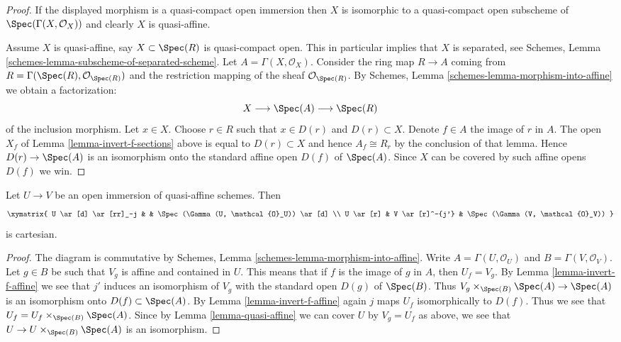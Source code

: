 \begin{proof}
If the displayed morphism is a quasi-compact open immersion then
$X$ is isomorphic to a quasi-compact open subscheme of
$\Spec(\Gamma(X, \mathcal{O}_X))$ and clearly $X$ is quasi-affine.

\medskip\noindent
Assume $X$ is quasi-affine, say $X \subset \Spec(R)$ is
quasi-compact open. This in particular implies that $X$ is
separated, see
Schemes, Lemma \ref{schemes-lemma-subscheme-of-separated-scheme}.
Let $A = \Gamma(X, \mathcal{O}_X)$.
Consider the ring map $R \to A$ coming from
$R = \Gamma(\Spec(R), \mathcal{O}_{\Spec(R)})$
and the restriction mapping of the sheaf $\mathcal{O}_{\Spec(R)}$.
By Schemes, Lemma \ref{schemes-lemma-morphism-into-affine}
we obtain a factorization:
$$
X \longrightarrow
\Spec(A) \longrightarrow
\Spec(R)
$$
of the inclusion morphism. Let $x \in X$. Choose $r \in R$ such that
$x \in D(r)$ and $D(r) \subset X$. Denote $f \in A$ the image of $r$
in $A$. The open $X_f$ of Lemma \ref{lemma-invert-f-sections}
above is equal to $D(r) \subset X$ and hence $A_f \cong R_r$ by the
conclusion of that lemma.
Hence $D(r) \to \Spec(A)$ is an isomorphism onto the
standard affine open $D(f)$ of $\Spec(A)$. Since $X$
can be covered by such affine opens $D(f)$ we win.
\end{proof}

\begin{lemma}
\label{lemma-cartesian-diagram-quasi-affine}
Let $U \to V$ be an open immersion of quasi-affine schemes. Then
$$
\xymatrix{
U \ar[d] \ar[rr]_-j & & \Spec(\Gamma(U, \mathcal{O}_U)) \ar[d] \\
U \ar[r] & V \ar[r]^-{j'} & \Spec(\Gamma(V, \mathcal{O}_V))
}
$$
is cartesian.
\end{lemma}

\begin{proof}
The diagram is commutative by Schemes, Lemma
\ref{schemes-lemma-morphism-into-affine}.
Write $A = \Gamma(U, \mathcal{O}_U)$ and $B = \Gamma(V, \mathcal{O}_V)$. Let
$g \in B$ be such that $V_g$ is affine and contained in $U$. This
means that if $f$ is the image of $g$ in $A$, then $U_f = V_g$. By Lemma
\ref{lemma-invert-f-affine} we see that $j'$ induces an isomorphism of
$V_g$ with the standard open $D(g)$ of $\Spec(B)$. Thus
$V_g \times_{\Spec(B)} \Spec(A) \to \Spec(A)$ is an
isomorphism onto $D(f) \subset \Spec(A)$. By Lemma \ref{lemma-invert-f-affine}
again $j$ maps $U_f$ isomorphically to $D(f)$. Thus we see that
$U_f = U_f \times_{\Spec(B)} \Spec(A)$. Since by
Lemma \ref{lemma-quasi-affine} we can cover $U$ by $V_g = U_f$ as above,
we see that $U \to U \times_{\Spec(B)} \Spec(A)$ is an isomorphism.
\end{proof}







